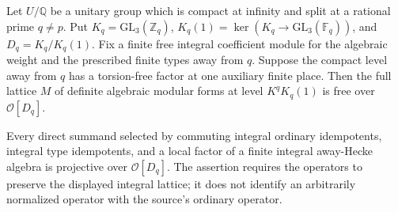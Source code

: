 \begin{lemma}
\label{G72-definite}
Let \(U/\mathbb Q\) be a unitary group which is compact at infinity
and split at a rational prime \(q\ne p\).  Put
\(K_q=\mathrm{GL}_3(\mathbb Z_q)\),
\(K_q(1)=\ker(K_q\to\mathrm{GL}_3(\mathbb F_q))\), and
\(D_q=K_q/K_q(1)\).  Fix a finite free integral coefficient
module for the algebraic weight and the prescribed finite types
away from \(q\).  Suppose the compact level away from \(q\)
has a torsion-free factor at one auxiliary finite place.
Then the full lattice \(M\) of definite algebraic modular forms
at level \(K^qK_q(1)\) is free over \(\mathcal O[D_q]\).

Every direct summand selected by commuting integral ordinary
idempotents, integral type idempotents, and a local factor of a
finite integral away-Hecke algebra is projective over
\(\mathcal O[D_q]\).  The assertion requires the operators to
preserve the displayed integral lattice; it does not identify an
arbitrarily normalized operator with the source's ordinary operator.
\end{lemma}
